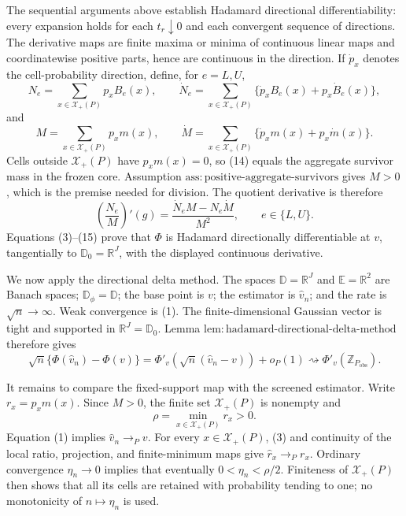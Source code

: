The sequential arguments above establish Hadamard directional
differentiability: every expansion holds for each \(t_r\downarrow0\) and
each convergent sequence of directions.  The derivative maps are finite
maxima or minima of continuous linear maps and coordinatewise positive
parts, hence are continuous in the direction.  If \(\dot p_x\) denotes
the cell-probability direction, define, for \(e=L,U\),
\[
N_e=\sum_{x\in\mathcal X_+(P)}p_xB_e(x),
\qquad
\dot N_e=\sum_{x\in\mathcal X_+(P)}
\{\dot p_xB_e(x)+p_x\dot B_e(x)\},
\tag{13}
\]
and
\[
M=\sum_{x\in\mathcal X_+(P)}p_xm(x),
\qquad
\dot M=\sum_{x\in\mathcal X_+(P)}
\{\dot p_xm(x)+p_x\dot m(x)\}.
\tag{14}
\]
Cells outside \(\mathcal X_+(P)\) have \(p_xm(x)=0\), so (14) equals
the aggregate survivor mass in the frozen core.  Assumption
\(\mathrm{ass{:}positive\text{-}aggregate\text{-}survivors}\) gives
\(M>0\), which is the premise needed for division.  The quotient
derivative is therefore
\[
\left(\frac{N_e}{M}\right)'(g)
=\frac{\dot N_eM-N_e\dot M}{M^2},
\qquad e\in\{L,U\}.
\tag{15}
\]
Equations (3)--(15) prove that \(\Phi\) is Hadamard directionally
differentiable at \(v\), tangentially to
\(\mathbb D_0=\mathbb R^J\), with the displayed continuous derivative.

We now apply the directional delta method.  The spaces
\(\mathbb D=\mathbb R^J\) and \(\mathbb E=\mathbb R^2\) are Banach
spaces; \(\mathbb D_\phi=\mathbb D\); the base point is \(v\); the
estimator is \(\widehat v_n\); and the rate is \(\sqrt n\to\infty\).
Weak convergence is (1).  The finite-dimensional Gaussian vector is
tight and supported in \(\mathbb R^J=\mathbb D_0\).  Lemma
\(\mathrm{lem{:}hadamard\text{-}directional\text{-}delta\text{-}method}\)
therefore gives
\[
\sqrt n\{\Phi(\widehat v_n)-\Phi(v)\}
=\Phi'_v\!\left(\sqrt n(\widehat v_n-v)\right)+o_P(1)
\rightsquigarrow\Phi'_v(\mathbb Z_{P_{\mathrm{obs}}}).
\tag{16}
\]

It remains to compare the fixed-support map with the screened estimator.
Write \(r_x=p_xm(x)\).  Since \(M>0\), the finite set
\(\mathcal X_+(P)\) is nonempty and
\[
\rho=\min_{x\in\mathcal X_+(P)}r_x>0.
\tag{17}
\]
Equation (1) implies \(\widehat v_n\to_Pv\).  For every
\(x\in\mathcal X_+(P)\), (3) and continuity of the local ratio,
projection, and finite-minimum maps give \(\widehat r_x\to_Pr_x\).
Ordinary convergence \(\eta_n\to0\) implies that eventually
\(0<\eta_n<\rho/2\).  Finiteness of \(\mathcal X_+(P)\) then shows that
all its cells are retained with probability tending to one; no
monotonicity of \(n\mapsto\eta_n\) is used.


